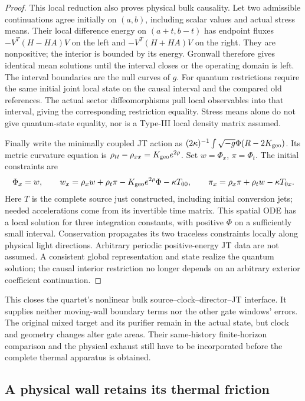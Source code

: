 \documentclass[12pt,a4paper]{article}
\begin{document}
\begin{proof}
This local reduction also proves physical bulk causality. Let two
admissible continuations agree initially on $(a,b)$, including scalar
values and actual stress means. Their local difference energy on
$(a+t,b-t)$ has endpoint fluxes
$-V^T(H-HA)V$ on the left and $-V^T(H+HA)V$ on the right.
They are nonpositive; the interior is bounded by its energy. Gronwall
therefore gives identical mean solutions until the interval closes or
the operating domain is left. The interval boundaries are the null
curves of $g$. For quantum restrictions require the same initial joint
local state on the causal interval and the compared old references.
The actual sector diffeomorphisms pull local observables into that
interval, giving the corresponding restriction equality. Stress means
alone do not give quantum-state equality, nor is a Type-III local
density matrix assumed.

Finally write the minimally coupled JT action as
$(2\kappa)^{-1}\int\sqrt{-g}\Phi(R-2K_{\rm geo})$.
Its metric curvature equation is
$\rho_{tt}-\rho_{xx}=K_{\rm geo}e^{2\rho}$.
Set $w=\Phi_x$, $\pi=\Phi_t$. The initial constraints are
\begin{equation}
 \Phi_x=w,\qquad
 w_x=\rho_xw+\rho_t\pi-K_{\rm geo}e^{2\rho}\Phi-\kappa T_{00},
 \qquad \pi_x=\rho_x\pi+\rho_tw-\kappa T_{0x}.             \label{eq:bulk-JT-constraints}
\end{equation}
Here $T$ is the complete source just constructed, including initial
conversion jets; needed accelerations come from its invertible time
matrix. This spatial ODE has a local solution for three integration
constants, with positive $\Phi$ on a sufficiently small interval.
Conservation propagates its two traceless constraints locally along
physical light directions. Arbitrary periodic positive-energy JT data
are not assumed. A consistent global representation and state realize
the quantum solution; the causal interior restriction no longer depends
on an arbitrary exterior coefficient continuation.
\end{proof}

This closes the quartet's nonlinear bulk source--clock--director--JT
interface. It supplies neither moving-wall boundary terms nor the
other gate windows' errors. The original mixed target and its purifier
remain in the actual state, but clock and geometry changes alter gate
areas. Their same-history finite-horizon comparison and the physical
exhaust still have to be incorporated before the complete thermal
apparatus is obtained.

\subsection{A physical wall retains its thermal friction}
\label{app:Dirac-wall-response}
\end{document}
